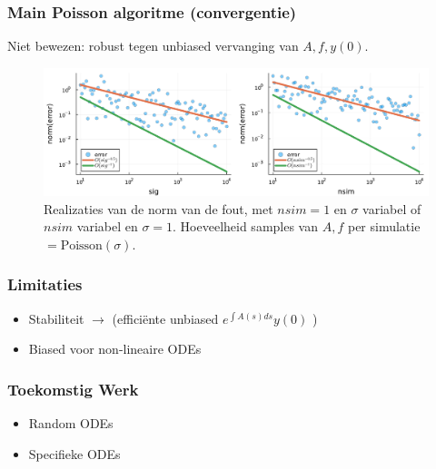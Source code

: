 \documentclass[18pt,aspectratio=149]{beamer}
\begin{document}
\begin{frame}
    \frametitle{Main Poisson algoritme (convergentie)}
    Niet bewezen: robust tegen unbiased vervanging van $A,f,y(0)$.
    \begin{figure}[h!]
        \centering
        \includegraphics[width=\textwidth]{imgs/convergence_main_poisson.pdf}
        \caption{Realizaties van de norm van de fout,
            met $nsim =1$ en $\sigma$ variabel of $nsim$ variabel en $\sigma = 1$.
            Hoeveelheid samples van $A,f$ per simulatie $= \text{Poisson}(\sigma)$.
        }
        \label{fig:imgs/main poisson convergentie}
    \end{figure}
\end{frame}



\begin{frame}
    \frametitle{Limitaties}
    \begin{itemize}
        \item Stabiliteit $\rightarrow$ \cite{kettunen_unbiased_2021}
              (efficiënte unbiased $e^{\int A(s) ds } y(0)$ )
        \item Biased voor non-lineaire ODEs
    \end{itemize}
\end{frame}

\begin{frame}
    \frametitle{Toekomstig Werk}
    \begin{itemize}
        \item Random ODEs
        \item Specifieke ODEs
    \end{itemize}
\end{frame}

\end{document}
